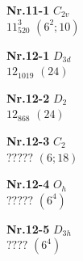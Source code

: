 \documentclass[12pt]{article}
\begin{document}
{\begin{minipage}[t]{3.5cm}
{{\bf Nr.11-1} \quad $C_{2v}$\\ $11^3_{520}$ \quad $(6^2;10)$\\\vspace{3mm} }
\end{minipage}
\setlength{\unitlength}{1cm}
\begin{minipage}[t]{3.5cm}
\centering
\epsfxsize=2.2cm
\par
{{\bf Nr.12-1} \quad $D_{3d}$\\ $12_{1019}$ \quad $(24)$\\\vspace{3mm} }
\end{minipage}
\setlength{\unitlength}{1cm}
\begin{minipage}[t]{3.5cm}
\centering
\epsfxsize=2.5cm
\par
{{\bf Nr.12-2} \quad $D_2$\\ $12_{868}$ \quad $(24)$\\\vspace{3mm} }
\end{minipage}
\setlength{\unitlength}{1cm}
\begin{minipage}[t]{3.5cm}
\centering
\epsfxsize=2.5cm
\par
{{\bf Nr.12-3} \quad $C_2$\\ $?????$ \quad $(6;18)$\\\vspace{3mm} }
\end{minipage}
\setlength{\unitlength}{1cm}
\begin{minipage}[t]{3.5cm}
\centering
\epsfxsize=2.5cm
\par
{{\bf Nr.12-4} \quad $O_h$\\ $?????$ \quad $(6^4)$\\\vspace{3mm} }
\end{minipage}
\setlength{\unitlength}{1cm}
\begin{minipage}[t]{3.5cm}
\centering
\epsfxsize=2.2cm
\par
{{\bf Nr.12-5} \quad $D_{3h}$\\ $????$ \quad $(6^4)$\\\vspace{3mm} }
\end{minipage}
}
\end{document}

